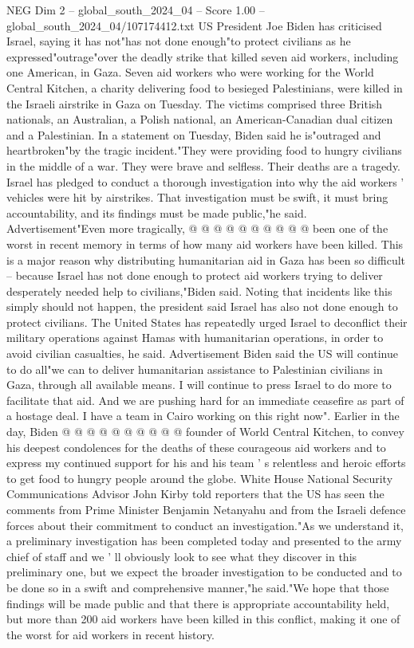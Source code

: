 \begin{textsample}{NEG Dim 2 – global\_south\_2024\_04 – Score 1.00 – global\_south\_2024\_04/107174412.txt}  \label{ex:f2_neg_398}
US President Joe Biden has criticised Israel, saying it has not"has not done enough"to protect civilians as he expressed"outrage"over the deadly strike that killed seven aid workers, including one American, in Gaza.
Seven aid workers who were working for the World Central Kitchen, a charity delivering food to besieged Palestinians, were killed in the Israeli airstrike in Gaza on Tuesday.
The victims comprised three British nationals, an Australian, a Polish national, an American-Canadian dual citizen and a Palestinian.
In a statement on Tuesday, Biden said he is"outraged and heartbroken"by the tragic incident."They were providing food to hungry civilians in the middle of a war.
They were brave and selfless.
Their deaths are a tragedy.
Israel has pledged to conduct a thorough investigation into why the aid workers ' vehicles were hit by airstrikes.
That investigation must be swift, it must bring accountability, and its findings must be made public,"he said.
Advertisement"Even more tragically, @ @ @ @ @ @ @ @ @ @ been one of the worst in recent memory in terms of how many aid workers have been killed.
This is a major reason why distributing humanitarian aid in Gaza has been so difficult -- because Israel has not done enough to protect aid workers trying to deliver desperately needed help to civilians,"Biden said.
Noting that incidents like this simply should not happen, the president said Israel has also not done enough to protect civilians.
The United States has repeatedly urged Israel to deconflict their military operations against Hamas with humanitarian operations, in order to avoid civilian casualties, he said.
Advertisement Biden said the US will continue to do all"we can to deliver humanitarian assistance to Palestinian civilians in Gaza, through all available means.
I will continue to press Israel to do more to facilitate that aid.
And we are pushing hard for an immediate ceasefire as part of a hostage deal.
I have a team in Cairo working on this right now".
Earlier in the day, Biden @ @ @ @ @ @ @ @ @ @ founder of World Central Kitchen, to convey his deepest condolences for the deaths of these courageous aid workers and to express my continued support for his and his team ' s relentless and heroic efforts to get food to hungry people around the globe.
White House National Security Communications Advisor John Kirby told reporters that the US has seen the comments from Prime Minister Benjamin Netanyahu and from the Israeli defence forces about their commitment to conduct an investigation."As we understand it, a preliminary investigation has been completed today and presented to the army chief of staff and we ' ll obviously look to see what they discover in this preliminary one, but we expect the broader investigation to be conducted and to be done so in a swift and comprehensive manner,"he said."We hope that those findings will be made public and that there is appropriate accountability held, but more than 200 aid workers have been killed in this conflict, making it one of the worst for aid workers in recent history.

\end{textsample}
